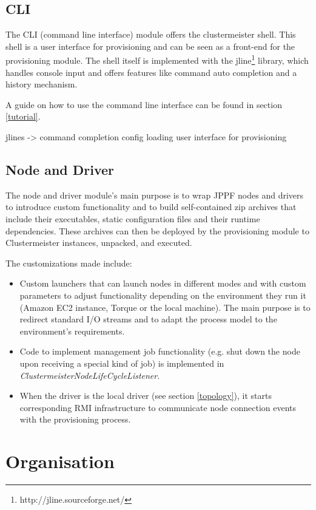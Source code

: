 \documentclass[12pt]{article}
\begin{document}
\subsection{CLI}

The CLI (command line interface) module offers the clustermeister shell. This shell is a user interface for provisioning and can be seen as a front-end for the provisioning module. The shell itself is implemented with the jline\footnote{http://jline.sourceforge.net/} library, which handles console input and offers features like command auto completion and a history mechanism.

A guide on how to use the command line interface can be found in section \ref{tutorial}.

jlines -> command completion
config loading
user interface for provisioning

\subsection{Node and Driver}
The node and driver module's main purpose is to wrap JPPF nodes and drivers to introduce custom functionality and to build self-contained zip archives that include their executables, static configuration files and their runtime dependencies. These archives can then be deployed by the provisioning module to Clustermeister instances, unpacked, and executed.

The customizations made include:

\begin{itemize}
\item Custom launchers that can launch nodes in different modes and with custom parameters to adjust functionality depending on the environment they run it (Amazon EC2 instance, Torque or the local machine). The main purpose is to redirect standard I/O streams and to adapt the process model to the environment's requirements.
\item Code to implement management job functionality (e.g. shut down the node upon receiving a special kind of job) is implemented in \textit{ClustermeisterNodeLifeCycleListener}.
\item When the driver is the local driver (see section \ref{topology}), it starts corresponding RMI infrastructure to communicate node connection events with the provisioning process.
\end{itemize}

\section{Organisation}
\end{document}

